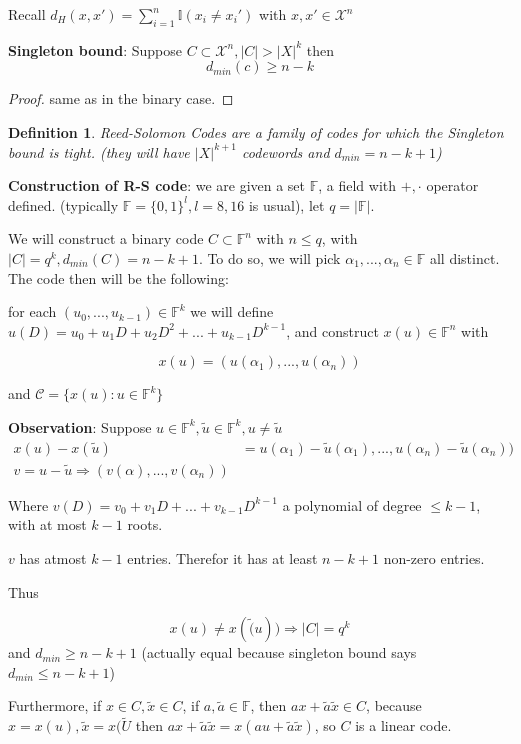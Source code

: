 \documentclass[twoside]{article}
\newtheorem{definition}{Definition}[section]
\theoremstyle{definition} %
\def\X{\mathcal{X}}
\def\F{\mathbb{F}}
\def\I{\mathbb{I}}
\def\C{\mathcal{C}}
\begin{document}
Recall $d_H(x, x') = \sum_{i = 1}^n \I(x_i \neq x_i')$ with $x, x'\in \X^n$

\textbf{Singleton bound}: Suppose $C \subset \X^n, |C| > |X|^k$ then
\[
  d_{min}(c) \geq n - k
\]

\begin{proof}
  same as in the binary case.
\end{proof}

\begin{definition}{Reed-Solomon Codes}
  are a family of codes for which the Singleton bound is tight. (they will have $|X|^{k+1}$ codewords and $d_{min} = n - k + 1$)
\end{definition}

\textbf{Construction of R-S code}: we are given a set $\F$, a field with $+, \cdot$ operator defined. (typically $\F = \{ 0, 1 \}^l, l = 8, 16$ is usual), let $q = |\F|$.

We will construct a binary code $C \subset \F^n$ with $n \leq q$, with $|C| = q^k, d_{min}(C) = n - k + 1$. To do so, we will pick $\alpha_1, ... , \alpha_n \in \F$ all distinct. The code then will be the following:

for each $(u_0, ..., u_{k-1}) \in \F^k$ we will define $u(D) = u_0 + u_1 D + u_2 D^2 + ... + u_{k-1} D^{k-1}$, and construct $x(u) \in \F^n$ with

\[
  x(u) = (u(\alpha_1), ..., u(\alpha_n))
\]

and $ \C = \{ x(u): u \in \F^k \}$

\textbf{Observation}: Suppose $u \in \F^k, \tilde{u} \in \F^k, u \neq \tilde{u}$
\begin{align*}
  x(u) - x(\tilde{u}) &= u(\alpha_1) - \tilde{u}(\alpha_1), ..., u(\alpha_n) - \tilde{u}(\alpha_n)) \\
  v = u - \tilde{u} \Rightarrow (v(\alpha), ..., v(\alpha_n))
\end{align*}

Where $v(D) = v_0 + v_1 D + ... + v_{k-1} D^{k-1}$ a polynomial of degree $\leq k-1$, with at most $k-1$ roots.

$v$ has atmost $k-1$ entries. Therefor it has at least $n - k + 1$ non-zero entries.

Thus

\[
  x(u) \neq x(\tilde(u)) \Rightarrow |C| = q^k
\]
and $d_{min} \geq n - k + 1$ (actually equal because singleton bound says $d_{min} \leq n - k + 1$)

Furthermore, if $x \in C, \tilde{x} \in C$, if $a, \tilde{a} \in \F$, then $ax + \tilde{a} \tilde{x} \in C$, because $x = x(u), \tilde{x} = x(\tilde{U}$ then $ax + \tilde{a} \tilde{x} = x(a u +  \tilde{a} \tilde{x})$, so $C$ is a linear code.
\end{document}
